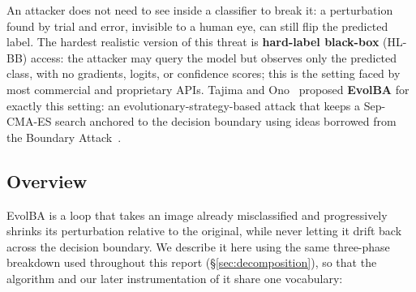 \documentclass[11pt, a4paper]{article}
\begin{document}
An attacker does not need to see inside a classifier to break it: a perturbation found by trial and error, invisible to a human eye, can still flip the predicted label. The hardest realistic version of this threat is \textbf{hard-label black-box} (HL-BB) access: the attacker may query the model but observes only the predicted class, with no gradients, logits, or confidence scores; this is the setting faced by most commercial and proprietary APIs. Tajima and Ono~\cite{evolba2024} proposed \textbf{EvolBA} for exactly this setting: an evolutionary-strategy-based attack that keeps a Sep-CMA-ES search anchored to the decision boundary using ideas borrowed from the Boundary Attack~\cite{ba2017}.

\subsection{Overview}

EvolBA is a loop that takes an image already misclassified and progressively shrinks its perturbation relative to the original, while never letting it drift back across the decision boundary. We describe it here using the same three-phase breakdown used throughout this report (\S\ref{sec:decomposition}), so that the algorithm and our later instrumentation of it share one vocabulary:
\end{document}
